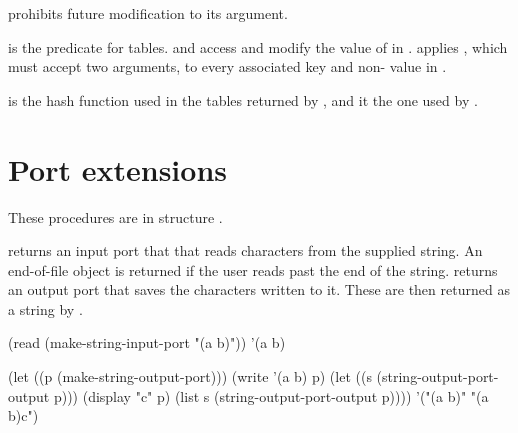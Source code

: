  prohibits future modification to its argument.

\begin{protos}
\end{protos}
\noindent
{} is the predicate for tables.
 and  access and modify the value of 
 in .
 applies , which must accept two arguments,
 to every associated key and non- value in .

\begin{protos}
\end{protos}
\noindent
{} is the hash function used in the tables
 returned by , and  it the one used
 by .

\section{Port extensions}

These procedures are in structure .

\begin{protos}
\end{protos}
\noindent {} returns an input port that
 that reads characters from the supplied string.  An end-of-file
 object is returned if the user reads past the end of the string.
 returns an output port that saves
 the characters written to it.
These are then returned as a string by .

\begin{example}
(read (make-string-input-port "(a b)"))
    \evalsto '(a b)

(let ((p (make-string-output-port)))
  (write '(a b) p)
  (let ((s (string-output-port-output p)))
    (display "c" p)
    (list s (string-output-port-output p))))
    \evalsto '("(a b)" "(a b)c")
\end{example}

